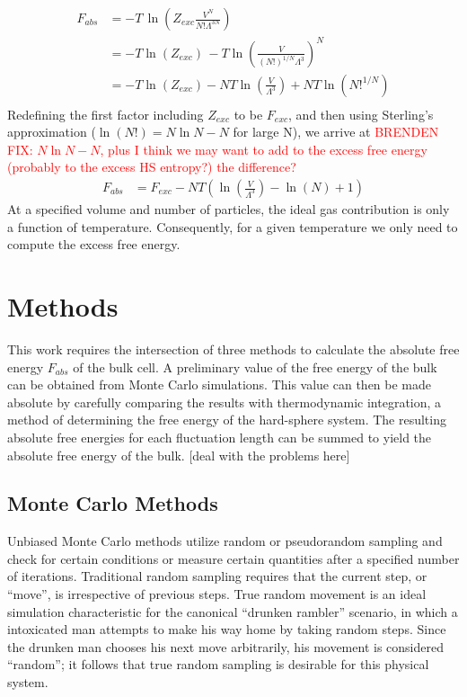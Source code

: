 \documentclass[12pt]{article}
\begin{document}
\begin{align}
    F_{abs} &= -T\,\ln\left(Z_{exc} \frac{V^N}{N!\Lambda^{3N}}\right)\\
    &= -T\ln\left(Z_{exc}\right)\, -T\ln\left(\frac{V}{(N!)^{1/N}\Lambda^3} \right)^N\\
    &= -T\ln\left(Z_{exc}\right) - NT\ln\left(\frac{V}{\Lambda^3}\right) + NT\ln\left(N!^{1/N}\right)\\ 
\end{align}
Redefining the first factor including $Z_{exc}$ to be $F_{exc}$, and then using Sterling's approximation ($\ln(N!) = N\ln N - N$ for large N), we arrive at \textcolor{red}{BRENDEN FIX: $N\ln N - N$, plus I think we may want to add to the excess free energy (probably to the excess HS entropy?) the difference?}
\begin{align}
    F_{abs} &= F_{exc} - NT\left(\ln\left(\frac{V}{\Lambda^3}\right) - \ln\left(N\right) + 1\right)
\end{align}
At a specified volume and number of particles, the ideal gas contribution is only a function of temperature. Consequently, for a given temperature we only need to compute the excess free energy.

\section{Methods}
This work requires the intersection of three methods to calculate the absolute free energy $F_{abs}$ of the bulk cell. A preliminary value of the free energy of the bulk can be obtained from Monte Carlo simulations. This value can then be made absolute by carefully comparing the results with thermodynamic integration, a method of determining the free energy of the hard-sphere system. The resulting absolute free energies for each fluctuation length can be summed to yield the absolute free energy of the bulk. {\color{red}[deal with the problems here]} 

\subsection{Monte Carlo Methods}

Unbiased Monte Carlo methods utilize random or pseudorandom sampling and check for certain conditions or measure certain quantities after a specified number of iterations. Traditional random sampling requires that the current step, or ``move'', is irrespective of previous steps. True random movement is an ideal simulation characteristic for the canonical ``drunken rambler'' scenario, in which a intoxicated man attempts to make his way home by taking random steps. Since the drunken man chooses his next move arbitrarily, his movement is considered ``random''; it follows that true random sampling is desirable for this physical system. \\
\end{document}
